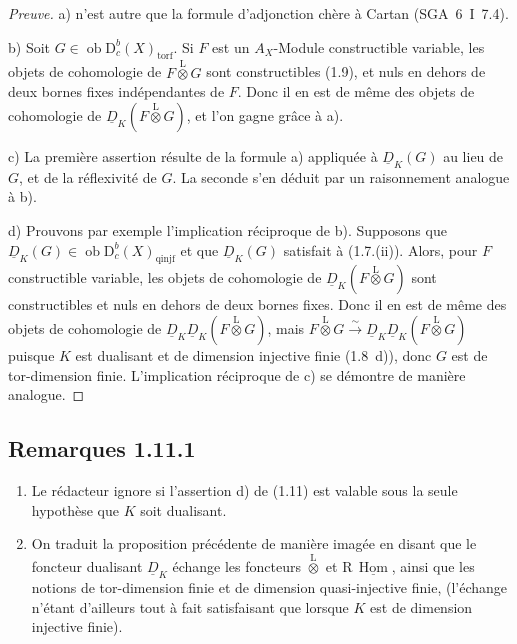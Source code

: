 \documentclass[11pt]{article}
\DeclareMathOperator{\Hom}{Hom}
\newcommand{\R}{\mathrm{R}}\newcommand{\RHomCore}{\mathrm{RHom}}
\newcommand{\D}{\mathrm{D}}
\newcommand{\ob}{\operatorname{ob}}
\providecommand{\Hom}{\operatorname{Hom}}
\providecommand{\ob}{\operatorname{ob}}
\providecommand{\R}{\mathrm R}
\providecommand{\Hom}{\operatorname{Hom}}
\begin{document}
\begin{proof}[Preuve]
a) n'est autre que la formule d'adjonction chère à Cartan (SGA~6~I~7.4).

b) Soit $G \in \ob \D_c^{b}(X)_{\mathrm{torf}}$. Si $F$ est un $A_X$-Module constructible variable, les objets de cohomologie de $F \mathop{\otimes}\limits^{\mathrm{L}} G$ sont constructibles (1.9), et nuls en dehors de deux bornes fixes indépendantes de $F$. Donc il en est de même des objets de cohomologie de $\underline{D}_K(F \mathop{\otimes}\limits^{\mathrm{L}} G)$, et l'on gagne grâce à a).

c) La première assertion résulte de la formule a) appliquée à $\underline{D}_K(G)$ au lieu de $G$, et de la réflexivité de $G$. La seconde s'en déduit par un raisonnement analogue à b).

d) Prouvons par exemple l'implication réciproque de b). Supposons que $\underline{D}_K(G) \in \ob \D_c^{b}(X)_{\mathrm{qinjf}}$ et que $\underline{D}_K(G)$ satisfait à (1.7.(ii)). Alors, pour $F$ constructible variable, les objets de cohomologie de $\underline{D}_K(F \mathop{\otimes}\limits^{\mathrm{L}} G)$ sont constructibles et nuls en dehors de deux bornes fixes. Donc il en est de même des objets de cohomologie de $\underline{D}_K \underline{D}_K(F \mathop{\otimes}\limits^{\mathrm{L}} G)$, mais $F \mathop{\otimes}\limits^{\mathrm{L}} G \xrightarrow{\sim} \underline{D}_K \underline{D}_K(F \mathop{\otimes}\limits^{\mathrm{L}} G)$ puisque $K$ est dualisant et de dimension injective finie (1.8~d)), donc $G$ est de tor-dimension finie. L'implication réciproque de c) se démontre de manière analogue.
\end{proof}

\subsection*{Remarques 1.11.1}
\begin{enumerate}
\item[a)] Le rédacteur ignore si l'assertion d) de (1.11) est valable sous la seule hypothèse que $K$ soit dualisant.
\item[b)] On traduit la proposition précédente de manière imagée en disant que le foncteur dualisant $\underline{D}_K$ échange les foncteurs $\mathop{\otimes}\limits^{\mathrm{L}}$ et $\R\,\underline{\Hom}$, ainsi que les notions de tor-dimension finie et de dimension quasi-injective finie, (l'échange n'étant d'ailleurs tout à fait satisfaisant que lorsque $K$ est de dimension injective finie).
\end{enumerate}
\end{document}
